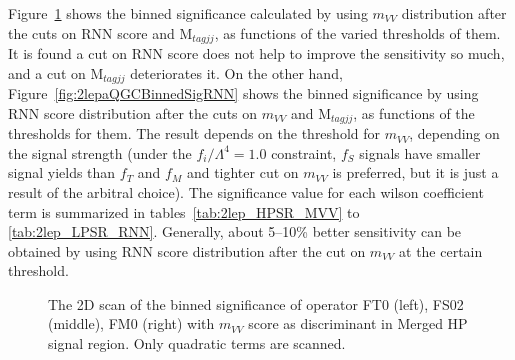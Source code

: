 Figure~\ref{fig:2lepaQGCBinnedSigMVV} shows the binned significance calculated by using $m_{VV}$ distribution after the cuts on RNN score and $\mathrm{M}_{tagjj}$, as functions of the varied thresholds of them.
It is found a cut on RNN score does not help to improve the sensitivity so much,
and a cut on $\mathrm{M}_{tagjj}$ deteriorates it.
On the other hand, Figure~\ref{fig:2lepaQGCBinnedSigRNN} shows the binned significance by using RNN score distribution
after the cuts on $m_{VV}$ and $\mathrm{M}_{tagjj}$, as functions of the thresholds for them.
The result depends on the threshold for $m_{VV}$, depending on the signal strength (under the $f_i/\Lambda^4 = 1.0$ constraint, $f_{S}$ signals have smaller signal yields than $f_{T}$ and $f_{M}$ and tighter cut on $m_{VV}$ is preferred, but it is just a result of the arbitral choice).
The significance value for each wilson coefficient term is summarized in tables~\ref{tab:2lep_HPSR_MVV} to \ref{tab:2lep_LPSR_RNN}.
Generally, about 5--10\% better sensitivity can be obtained by using RNN score distribution after the cut on $m_{VV}$ at the certain threshold.

\begin{figure}[ht]
    \centering
        \caption{The 2D scan of the binned significance of operator FT0 (left), FS02 (middle), FM0 (right) with $m_{VV}$ score as discriminant in Merged HP signal region. Only quadratic terms are scanned.}
        \label{fig:2lepaQGCBinnedSigMVV}
\end{figure}


